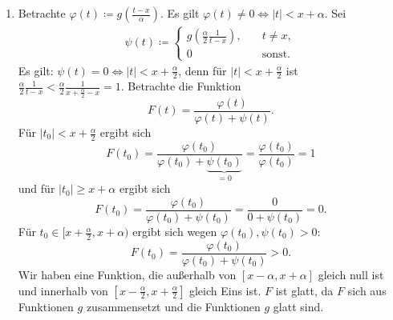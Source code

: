\documentclass[a4paper,DIV=1]{article}
\theoremstyle{plain}
\begin{document}
\begin{enumerate}[label=(\roman*)]
	\item Betrachte $\varphi(t) \coloneqq g(\frac{t-x}{\alpha})$. Es gilt $\varphi(t) \neq 0 \iff |t| < x+\alpha$. Sei 
	\begin{align*}
		\psi(t) \coloneqq \begin{cases}
			g(\frac{\alpha}{2}\frac{1}{t-x}), \quad& t \neq x, \\
			0 \quad &\text{sonst}.
		\end{cases}
	\end{align*}
	Es gilt: $\psi(t) = 0 \iff |t| < x+\frac{\alpha}{2}$, denn für $|t| < x+\frac{\alpha}{2}$ ist $\frac{\alpha}{2}\frac{1}{t-x} < \frac{\alpha}{2}\frac{1}{x+\frac{\alpha}{2}-x} = 1$. Betrachte die Funktion
	\[
		F(t) = \frac{\varphi(t)}{\varphi(t)+\psi(t)}.
	\]
	Für $|t_0| < x+\frac{\alpha}{2}$ ergibt sich
	\[
		F(t_0) = \frac{\varphi(t_0)}{\varphi(t_0)+\underbrace{\psi(t_0)}_{=0}} =  \frac{\varphi(t_0)}{\varphi(t_0)} = 1
	\]
	und für $|t_0| \geq x+\alpha$ ergibt sich
		\[
		F(t_0) = \frac{\varphi(t_0)}{\varphi(t_0)+\psi(t_0)} =  \frac{0}{0+\psi(t_0)} = 0.
	\]
	Für $t_0 \in [x+\frac{\alpha}{2}, x+ \alpha)$ ergibt sich wegen $\varphi(t_0), \psi(t_0) > 0$:
	\[
		F(t_0) = \frac{\varphi(t_0)}{\varphi(t_0)+\psi(t_0)}  > 0.
	\]
	Wir haben eine Funktion, die außerhalb von $[x-\alpha, x+\alpha]$ gleich null ist und innerhalb von $[x-\frac{\alpha}{2}, x+\frac{\alpha}{2}]$ gleich Eins ist. $F$ ist glatt, da $F$ sich aus Funktionen $g$ zusammensetzt und die Funktionen $g$ glatt sind.
\end{enumerate}
\end{document}
